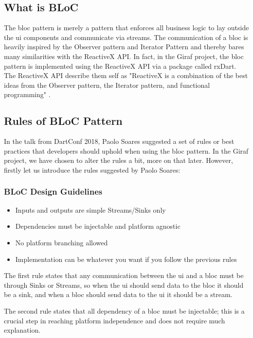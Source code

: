 \subsection{What is BLoC}
The \gls{bloc} pattern is merely a pattern that enforces all business logic to lay outside the \gls{ui} components and communicate via streams. The communication of a \gls{bloc} is heavily inspired by the Observer pattern and Iterator Pattern and thereby bares many similarities with the ReactiveX API. In fact, in the Giraf project, the \gls{bloc} pattern is implemented using the ReactiveX API via a package called rxDart. The ReactiveX API describe them self as "ReactiveX is a combination of the best ideas from the Observer pattern, the Iterator pattern, and functional programming" \cite{ReactiveXWebsite}.

\subsection{Rules of BLoC Pattern}
In the talk from DartConf 2018, Paolo Soares suggested a set of rules or best practices that developers should uphold when using the \gls{bloc} pattern. In the Giraf project, we have chosen to alter the rules a bit, more on that later. However, firstly let us introduce the rules suggested by Paolo Soares:

\subsubsection{BLoC Design Guidelines}
\begin{itemize}
  \item Inputs and outputs are simple Streams/Sinks only
  \item Dependencies must be injectable and platform agnostic
  \item No platform branching allowed
  \item Implementation can be whatever you want if you follow the previous rules
\end{itemize}

The first rule states that any communication between the \gls{ui} and a \gls{bloc} must be through Sinks or Streams, so when the \gls{ui} should send data to the \gls{bloc} it should be a sink, and when a \gls{bloc} should send data to the \gls{ui} it should be a stream.

The second rule states that all dependency of a \gls{bloc} must be injectable; this is a crucial step in reaching platform independence and does not require much explanation.

